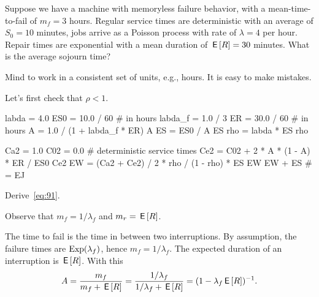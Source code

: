 \documentclass[queueing-book.tex]{subfiles}
\begin{document}
\begin{exercise}\label{ex:l-157}
Suppose we have a machine with memoryless failure behavior, with a mean-time-to-fail of $m_{f}=3$ hours.
Regular service times are deterministic with an average of $S_{0}=10$ minutes, jobs arrive as a Poisson process with rate of $\lambda=4$ per hour.
Repair times are exponential with a mean duration of $\,\mathsf{E}\left[R\right] = 30$ minutes.
What is the average sojourn time?
\begin{hint}
 Mind to work in a consistent set of units, e.g., hours. It is easy to make mistakes.
\end{hint}
\begin{solution}
  Let's first check that $\rho< 1$.
\begin{pyconsole}
labda = 4.0
ES0 = 10.0 / 60  # in hours
labda_f = 1.0 / 3
ER = 30.0 / 60  # in hours
A = 1.0 / (1 + labda_f * ER)
A
ES = ES0 / A
ES
rho = labda * ES
rho
\end{pyconsole}
\begin{pyconsole}
Ca2 = 1.0
C02 = 0.0  # deterministic service times
Ce2 = C02 + 2 * A * (1 - A) * ER / ES0
Ce2
EW = (Ca2 + Ce2) / 2 * rho / (1 - rho) * ES
EW
EW + ES  # = EJ
\end{pyconsole}
\end{solution}
\end{exercise}

\begin{exercise}\label{ex:80}
 Derive~\cref{eq:91}.
\begin{hint}
 Observe that $m_f = 1/\lambda_f$ and $m_r = \,\mathsf{E}\left[R\right]$.
\end{hint}
\begin{solution}
  The time to fail is the time in between two interruptions.
  By assumption, the failure times are $\mathrm{Exp}(\lambda_f)$, hence $m_f = 1/\lambda_f$.
  The expected duration of an interruption is $\,\mathsf{E}\left[R\right]$.   With this
\begin{equation*}
 A=\frac{m_f}{m_f + \,\mathsf{E}\left[R\right]}=\frac{1/\lambda_f }{1/\lambda_f + \,\mathsf{E}\left[R\right]} = (1-\lambda_{f} \,\mathsf{E}\left[R\right])^{-1}.
\end{equation*}
\end{solution}
\end{exercise}
\end{document}
